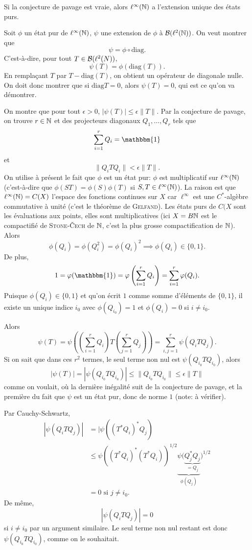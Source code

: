 \begin{prop}
  Si la conjecture de pavage est vraie, alors 
  $ \ell^\infty(\mathbb{N}) $ a l'extension unique des états purs.
\end{prop}

\begin{preuve}
  Soit $\phi$ un état pur de $\ell^\infty(\mathbb{N})$, $\psi$ une extension de $\phi$ à $\mathcal{B}(\ell^2(\mathbb{N}))$. On veut
  montrer que 
  \[ \psi = \phi \circ \mathrm{diag}. \]
  C'est-à-dire, pour tout $T \in \mathcal{B}(\ell^2(N))$, 
  \[ \psi(T) = \phi(\mathrm{diag}(T)). \]
  En remplaçant $T$ par $T - \mathrm{diag}(T)$, on obtient un opérateur de diagonale nulle. On doit donc
  montrer que si $\mathrm{diag} T = 0$, alors $\psi(T) = 0$, qui est ce qu'on va démontrer.

  On montre que pour tout $\epsilon > 0$, $|\psi(T)| \leq \epsilon \|T\|$. Par la conjecture de pavage, on
  trouve $r \in \mathbb{N}$ et des projecteurs diagonaux $Q_1, \ldots, Q_r$ tels que 
  \[ \sum_{i = 1}^{r} Q_i = \mathbbm{1} \]
  et 
  \[ \|Q_iTQ_i\| < \epsilon \|T\|. \]
  On utilise à présent le fait que $\phi$ est un état pur: $\phi$ est multiplicatif sur $\ell^\infty(\mathbb{N})$
  (c'est-à-dire que $\phi(ST) = \phi(S)\phi(T)$ si $S, T \in \ell^\infty(\mathbb{N})$). La raison est que
  $\ell^\infty(\mathbb{N}) = C(X)$ l'espace des fonctions continues sur $X$ car $\ell^\infty$ est une
  $C^\ast$-algèbre commutative à unité (c'est le théorème de \textsc{Gelfand}). Les états purs de $C(X$ sont
  les évaluations aux points, elles sont multiplicatives (ici $X = B\mathbb{N}$ est le compactifié de
  \textsc{Stone-\v{C}ech} de $\mathbb{N}$, c'est la plus grosse compactification de $\mathbb{N}$).
  Alors 
  \[ \phi(Q_i) = \phi(Q_i^2) = \phi(Q_i)^2 \implies \phi(Q_i) \in \{0,1\}. \]
  De plus, 
  \[ 1 = \phi(\mathbbm{1}) = \phi \left(\sum_{i = 1}^{r} Q_i\right) = \sum_{i = 1}^{r}\phi(Q_i). \]
  Puisque $\phi(Q_i) \in \{0,1\}$ et qu'on écrit $1$ comme somme d'éléments de $\{0,1\}$, il existe un unique
  indice $i_0$ avec $\phi(Q_{i_0}) = 1$ et $\phi(Q_i) = 0$ si $i \neq i_0$.

  Alors 
  \[ \psi(T) = \psi \left( \left(\sum_{i=1}^{r} Q_i\right) T \left(\sum_{j = 1}^{r} Q_j\right)\right) =
    \sum_{i,j=1}^{r} \psi(Q_iTQ_j). \]
  Si on sait que dans ces $r^2$ termes, le seul terme non nul est $\psi(Q_{i_0}TQ_{i_0})$, alors 
  \[ |\psi(T)| = |\psi(Q_{i_0}TQ_{i_0})| \leq \|Q_{i_0}TQ_{i_0}\| \leq \epsilon \|T\| \]
  comme on voulait, où la dernière inégalité suit de la conjecture de pavage, et la première du fait que
  $\psi$ est un état pur, donc de norme $1$ (note: à vérifier).

  Par Cauchy-Schwartz, 
  \begin{align*}
    |\psi(Q_iTQ_j)| &= |\psi\left((T^\ast Q_i)^\ast Q_j\right)\\
    &\leq \psi \left((T^\ast Q_i)^\ast (T^\ast Q_i)\right)^{1/2} \underbrace{\psi(\underbrace{Q_j^\ast Q_j}_{=Q_j}}_{\phi(Q_j)}) ^{1/2}\\
    &= 0 \text{ si } j \neq i_0.
  \end{align*}
  De même, 
  \[ |\psi(Q_i T Q_j)| = 0 \]
  si $i \neq i_0$ par un argument similaire. Le seul terme non nul restant est donc $\psi(Q_{i_0}TQ_{i_0})$,
  comme on le souhaitait.
\end{preuve}



